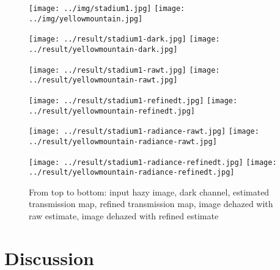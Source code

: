 \documentclass{article}
\begin{document}
\begin{figure}[H]
    \centering
    \begin{minipage}[b]{\linewidth}
        \centering
        \texttt{[image: ../img/stadium1.jpg]}
        \texttt{[image: ../img/yellowmountain.jpg]}
    \end{minipage}
    \begin{minipage}[b]{\linewidth}
        \centering
        \texttt{[image: ../result/stadium1-dark.jpg]}
        \texttt{[image: ../result/yellowmountain-dark.jpg]}
    \end{minipage}
    \begin{minipage}[b]{\linewidth}
        \centering
        \texttt{[image: ../result/stadium1-rawt.jpg]}
        \texttt{[image: ../result/yellowmountain-rawt.jpg]}
    \end{minipage}
    \begin{minipage}[b]{\linewidth}
        \centering
        \texttt{[image: ../result/stadium1-refinedt.jpg]}
        \texttt{[image: ../result/yellowmountain-refinedt.jpg]}
    \end{minipage}
    \begin{minipage}[b]{\linewidth}
        \centering
        \texttt{[image: ../result/stadium1-radiance-rawt.jpg]}
        \texttt{[image: ../result/yellowmountain-radiance-rawt.jpg]}
    \end{minipage}
    \begin{minipage}[b]{\linewidth}
        \centering
        \texttt{[image: ../result/stadium1-radiance-refinedt.jpg]}
        \texttt{[image: ../result/yellowmountain-radiance-refinedt.jpg]}
    \end{minipage}
    \caption{From top to bottom: input hazy image, dark channel, estimated transmission map, refined transmission map, image dehazed with raw estimate, image dehazed with refined estimate}
    \label{fig:result4}
\end{figure}

\section{Discussion}




\end{document}
